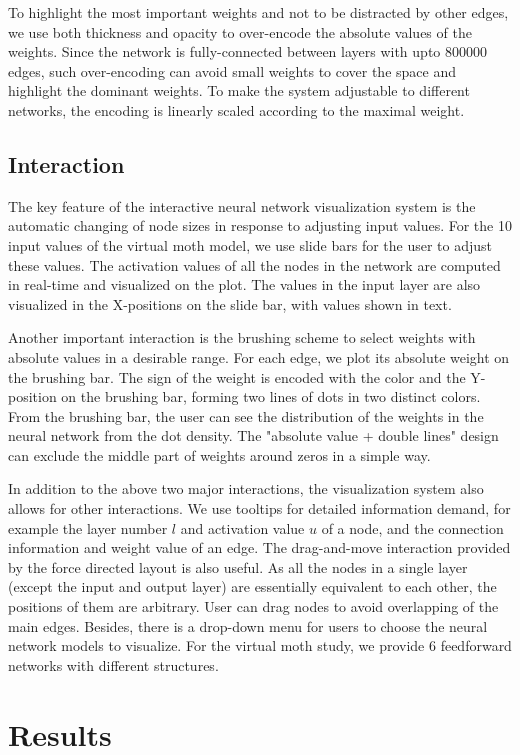 \documentclass[sigchi]{acmart}
\begin{document}
To highlight the most important weights and not to be distracted by other edges, we use both thickness and opacity to over-encode the absolute values of the weights. Since the network is fully-connected between layers with upto 800000 edges, such over-encoding can avoid small weights to cover the space and highlight the dominant weights. To make the system adjustable to different networks, the encoding is linearly scaled according to the maximal weight.

\subsection{Interaction}
The key feature of the interactive neural network visualization system is the automatic changing of node sizes in response to adjusting input values. For the 10 input values of the virtual moth model, we use slide bars for the user to adjust these values. The activation values of all the nodes in the network are computed in real-time and visualized on the plot. The values in the input layer are also visualized in the X-positions on the slide bar, with values shown in text.

Another important interaction is the brushing scheme to select weights with absolute values in a desirable range. For each edge, we plot its absolute weight on the brushing bar. The sign of the weight is encoded with the color and the Y-position on the brushing bar, forming two lines of dots in two distinct colors. From the brushing bar, the user can see the distribution of the weights in the neural network from the dot density. The "absolute value + double lines" design can exclude the middle part of weights around zeros in a simple way.

In addition to the above two major interactions, the visualization system also allows for other interactions. We use tooltips for detailed information demand, for example the layer number $l$ and activation value $u$ of a node, and the connection information and weight value of an edge. The drag-and-move interaction provided by the force directed layout is also useful. As all the nodes in a single layer (except the input and output layer) are essentially equivalent to each other, the positions of them are arbitrary. User can drag nodes to avoid overlapping of the main edges. Besides, there is a drop-down menu for users to choose the neural network models to visualize. For the virtual moth study, we provide 6 feedforward networks with different structures.

\section{Results}
\end{document}
